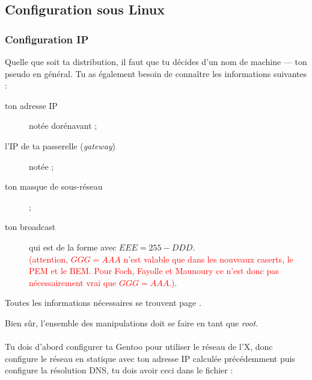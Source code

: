 


\subsection{Configuration sous Linux}

\subsubsection{Configuration IP}
Quelle que soit ta distribution, il faut que tu d\'ecides d'un nom de
machine --- ton pseudo en g\'en\'eral. Tu as \'egalement besoin de
conna\^itre les informations suivantes :
\begin{description}
  \item [ton adresse IP] not\'ee dor\'enavant  ;
  \item [l'IP de ta passerelle (\emph{gateway})] not\'ee  ;
  \item [ton masque de sous-r\'eseau]  ;
  \item [ton broadcast] qui est de la forme  avec $EEE = 255 - DDD$. \\
        \textcolor{red}{(attention, $GGG = AAA$ n'est valable que dans les nouveaux caserts, le PEM et le BEM. Pour Foch, Fayolle et Maunoury ce n'est donc pas n\'ecessairement vrai que $GGG =
        AAA$.)}.
\end{description}

Toutes les informations n\'ecessaires se trouvent page
\pageref{calcul_ip}.

Bien s\^ur, l'ensemble des manipulations doit se faire en tant que \emph{root}.


\paragraph{}

Tu dois d'abord configurer ta Gentoo pour utiliser le r\'eseau de l'X, donc configure le réseau en statique avec ton adresse IP calcul\'ee pr\'ec\'edemment puis
configure la r\'esolution DNS, tu dois avoir ceci dans le fichier  :

